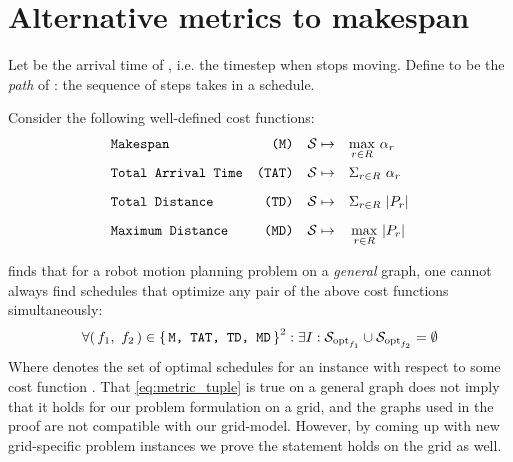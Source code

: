 \section{Alternative metrics to makespan}


Let  be the arrival time of , i.e. the timestep when  stops moving. Define  to be the \emph{path} of : the sequence of steps  takes in a schedule. 

Consider the following well-defined cost functions:
\begin{align*}
	& \texttt{Makespan} 				& \texttt{(M)} && \mathcal{S} \mapsto \quad & \smash{\max_{r \in R}} \ \alpha_r 	\\[2mm] 
	& \texttt{Total Arrival Time} 	& \texttt{(TAT)} && \mathcal{S} \mapsto \quad & \Sigma_{r \in R} \ \alpha_r 		\\[2mm]
	& \texttt{Total Distance} 		& \texttt{(TD)} && \mathcal{S} \mapsto \quad & \Sigma_{r \in R} \ \lvert P_r\rvert 		\\[2mm]
	& \texttt{Maximum Distance} 		& \texttt{(MD)} && \mathcal{S} \mapsto \quad & \max_{r \in R} \ \lvert P_r\rvert
\end{align*}


\cite{corr/YuL15c} finds that for a robot motion planning problem on a \emph{general} graph, one cannot always find schedules that optimize any pair of the above cost functions simultaneously: 
\begin{align}\label{eq:metric_tuple}
	\forall (\, f_1,\ f_2 \,) \in \set{\texttt{M, TAT, TD, MD}}^2 : \exists I : \mathcal{S}_{\text{opt}_{f_1}} \cup \mathcal{S}_{\text{opt}_{f_2}} = \emptyset
\end{align}
Where  denotes the set of optimal schedules for an instance  with respect to some cost function . That \cref{eq:metric_tuple} is true on a general graph does not imply that it holds for our problem formulation on a grid, and the graphs used in the proof are not compatible with our grid-model. However, by coming up with new grid-specific problem instances we prove the statement holds on the grid as well.

